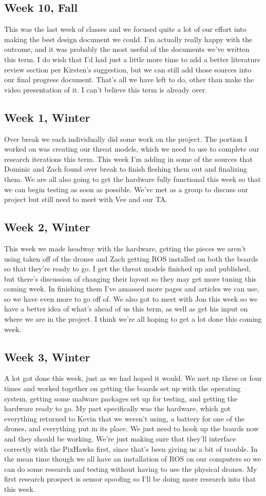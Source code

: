 \documentclass[IEEEtran,letterpaper,10pt,notitlepage,draftclsnofoot,onecolumn]{article}
\begin{document}
\subsection{Week 10, Fall}
This was the last week of classes and we focused quite a lot of our effort into making the best design document we could. I'm actually really happy with the outcome, and it was probably the most useful of the documents we've written this term. I do wish that I'd had just a little more time to add a better literature review section per Kirsten's suggestion, but we can still add those sources into our final progress document. That's all we have left to do, other than make the video presentation of it. I can't believe this term is already over.
\subsection{Week 1, Winter}
Over break we each individually did some work on the project. The portion I worked on was creating our threat models, which we need to use to complete our research iterations this term. This week I'm adding in some of the sources that Dominic and Zach found over break to finish fleshing them out and finalizing them. We are all also going to get the hardware fully functional this week so that we can begin testing as soon as possible. We've met as a group to discuss our project but still need to meet with Vee and our TA.
\subsection{Week 2, Winter}
This week we made headway with the hardware, getting the pieces we aren't using taken off of the drones and Zach getting ROS installed on both the boards so that they're ready to go. I get the threat models finished up and published, but there's discussion of changing their layout so they may get more tuning this coming week. In finishing them I've amassed more pages and articles we can use, so we have even more to go off of. We also got to meet with Jon this week so we have a better idea of what's ahead of us this term, as well as get his input on where we are in the project. I think we're all hoping to get a lot done this coming week.
\subsection{Week 3, Winter}
A lot got done this week, just as we had hoped it would. We met up three or four times and worked together on getting the boards set up with the operating system, getting some malware packages set up for testing, and getting the hardware ready to go. My part specifically was the hardware, which got everything returned to Kevin that we weren't using, a battery for one of the drones, and everything put in its place. We just need to hook up the boards now and they should be working. We're just making sure that they'll interface correctly with the PixHawks first, since that's been giving us a bit of trouble. In the mean time though we all have an installation of ROS on our computers so we can do some research and testing without having to use the physical drones. My first research prospect is sensor spoofing so I'll be doing more research into that this week.
\end{document}
